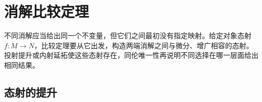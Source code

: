 
\section{消解比较定理}
\label{b4:sec:0702}

不同消解应当给出同一个不变量，但它们之间最初没有指定映射。给定对象态射 \(f:M\to N\)，比较定理要从它出发，构造两端消解之间与微分、增广相容的态射。投射提升或内射延拓使这些态射存在，同伦唯一性再说明不同选择在哪一层面给出相同结果。


%
%

\subsection{态射的提升}
\label{b4:subsec:0702:01}

